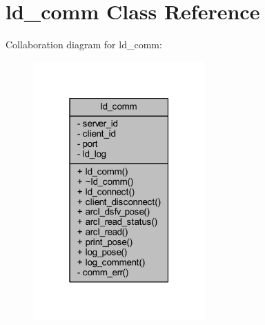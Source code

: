 \hypertarget{classld__comm}{}\section{ld\+\_\+comm Class Reference}
\label{classld__comm}


Collaboration diagram for ld\+\_\+comm\+:\nopagebreak
\begin{figure}[H]
\begin{center}
\leavevmode
\includegraphics[width=187pt]{classld__comm__coll__graph}
\end{center}
\end{figure}

